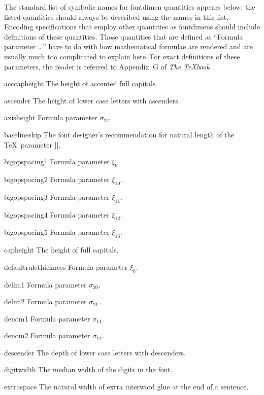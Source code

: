 \documentclass[a4paper]{article}
\begin{document}
The standard list of symbolic names for fontdimen quantities appears 
below; the listed quantities should always be described using the names 
in this list. Encoding specifications that employ other quantities as 
fontdimens should include definitions of these quantities. Those 
quantities that are defined as ``Formula parameter \dots'' have to 
do with how mathematical formulae are rendered and are usually much 
too complicated to explain here. For exact definitions of these 
parameters, the reader is referred to Appendix~G of \textit{The 
\TeX book}~\cite{TeXbook}.
\begin{list}{}{%
   \setlength{}%
   \setlength\itemindent{-\leftmargin}%
   \def\makelabel#1{\hspace{\labelsep}\normalfont\itshape #1}%
   \setlength\itemsep{0.5\itemsep}%
   \setlength\parsep{0.5\parsep}%
}
\item[acccapheight]
  The height of accented full capitals.
\item[ascender]
  The height of lower case letters with ascenders.
\item[axisheight] Formula parameter $\sigma_{22}$.
\item[baselineskip]
  The font designer's recommendation for natural length of the 
  \TeX\ parameter |\baselineskip|.
\item[bigopspacing1] Formula parameter $\xi_{9}$.
\item[bigopspacing2] Formula parameter $\xi_{10}$.
\item[bigopspacing3] Formula parameter $\xi_{11}$.
\item[bigopspacing4] Formula parameter $\xi_{12}$.
\item[bigopspacing5] Formula parameter $\xi_{13}$.
\item[capheight]
  The height of full capitals.
\item[defaultrulethickness] Formula parameter $\xi_{8}$.
\item[delim1] Formula parameter $\sigma_{20}$.
\item[delim2] Formula parameter $\sigma_{21}$.
\item[denom1] Formula parameter $\sigma_{11}$.
\item[denom2] Formula parameter $\sigma_{12}$.
\item[descender]
  The depth of lower case letters with descenders.
\item[digitwidth]
  The median width of the digits in the font.
\item[extraspace]
  The natural width of extra interword glue at the end of a sentence. 

\end{list}
\end{document}
